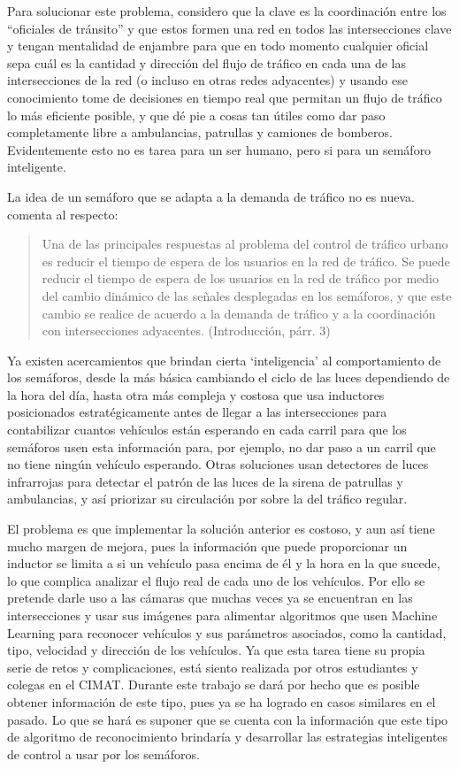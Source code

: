 Para solucionar este problema, considero que la clave es la coordinación
entre los ``oficiales de tránsito'' y que estos formen una red en todos
las intersecciones clave y tengan mentalidad de enjambre para que en
todo momento cualquier oficial sepa cuál es la cantidad y dirección del
flujo de tráfico en cada una de las intersecciones de la red (o incluso
en otras redes adyacentes) y usando ese conocimiento tome de decisiones
en tiempo real que permitan un flujo de tráfico lo más eficiente
posible, y que dé pie a cosas tan útiles como dar paso completamente
libre a ambulancias, patrullas y camiones de bomberos. Evidentemente
esto no es tarea para un ser humano, pero si para un semáforo
inteligente.

La idea de un semáforo que se adapta a la demanda de tráfico no es
nueva. \textcite{JoelTrejo2006} comenta al respecto:

\begin{quote}
Una de las principales respuestas al problema del control de tráfico
urbano es reducir el tiempo de espera de los usuarios en la red de
tráfico. Se puede reducir el tiempo de espera de los usuarios en la red
de tráfico por medio del cambio dinámico de las señales desplegadas en
los semáforos, y que este cambio se realice de acuerdo a la demanda de
tráfico y a la coordinación con intersecciones adyacentes.
(Introducción, párr. 3)
\end{quote}

Ya existen acercamientos que brindan cierta `inteligencia' al
comportamiento de los semáforos, desde la más básica cambiando el ciclo
de las luces dependiendo de la hora del día, hasta otra más compleja y
costosa que usa inductores posicionados estratégicamente antes de llegar
a las intersecciones para contabilizar cuantos vehículos están esperando
en cada carril para que los semáforos usen esta información para, por
ejemplo, no dar paso a un carril que no tiene ningún vehículo esperando.
Otras soluciones usan detectores de luces infrarrojas para detectar el
patrón de las luces de la sirena de patrullas y ambulancias, y así
priorizar su circulación por sobre la del tráfico regular.

El problema es que implementar la solución anterior es costoso, y aun
así tiene mucho margen de mejora, pues la información que puede
proporcionar un inductor se limita a si un vehículo pasa encima de él y
la hora en la que sucede, lo que complica analizar el flujo real de cada
uno de los vehículos. Por ello se pretende darle uso a las cámaras que
muchas veces ya se encuentran en las intersecciones y usar sus imágenes
para alimentar algoritmos que usen Machine Learning para reconocer
vehículos y sus parámetros asociados, como la cantidad, tipo, velocidad
y dirección de los vehículos. Ya que esta tarea tiene su propia serie de
retos y complicaciones, está siento realizada por otros estudiantes y
colegas en el CIMAT. Durante este trabajo se dará por hecho que es
posible obtener información de este tipo, pues ya se ha logrado en casos
similares en el pasado. Lo que se hará es suponer que se cuenta con la
información que este tipo de algoritmo de reconocimiento brindaría y
desarrollar las estrategias inteligentes de control a usar por los
semáforos.

